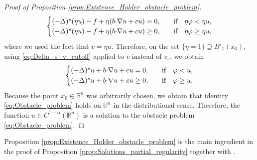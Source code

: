 \documentclass[11pt,reqno]{amsart}
\theoremstyle{definition}
\theoremstyle{remark}
\begin{document}
\begin{proof}[Proof of Proposition \ref{prop:Existence_Holder_obstacle_problem}]
\begin{equation}
\begin{aligned}
\begin{cases}
(-\Delta)^s (\eta u) - f + \eta(b{\hbox{$\cdot$}}\nabla u+c u) =0,&\quad\hbox{if}\quad\eta\varphi<\eta u,\\
(-\Delta)^s (\eta u) - f + \eta(b{\hbox{$\cdot$}}\nabla u+c u) \geq 0,&\quad\hbox{if}\quad\eta\varphi\geq \eta u,
\end{cases}
\end{aligned}
\end{equation}
where we used the fact that $v=\eta u$. Therefore, on the set $\{\eta=1\}\supseteq B'_1(x_0)$, using \eqref{eq:Delta_s_v_cutoff} applied to $v$ instead of $v_{\varepsilon}$, we obtain
\begin{equation*}
\begin{aligned}
\begin{cases}
(-\Delta)^s  u + b{\hbox{$\cdot$}}\nabla u+c u =0,&\quad\hbox{if}\quad \varphi< u,\\
(-\Delta)^s  u + b{\hbox{$\cdot$}}\nabla u+c u \geq 0,&\quad\hbox{if}\quad\varphi\geq u.
\end{cases}
\end{aligned}
\end{equation*}
Because the point $x_0\in{\mathbb{R}}^n$ was arbitrarily chosen, we obtain that identity \eqref{eq:Obstacle_problem} holds on ${\mathbb{R}}^n$ in the distributional sense. Therefore, the function $u \in C^{1+\alpha}({\mathbb{R}}^n)$ is a solution to the obstacle problem \eqref{eq:Obstacle_problem}.
\end{proof}

Proposition \ref{prop:Existence_Holder_obstacle_problem} is the main ingredient in the proof of Proposition \ref{prop:Solutions_partial_regularity} together with \cite[Theorem 5.8]{Silvestre_2007}.
\end{document}
